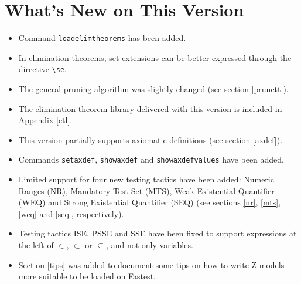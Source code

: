 \section{What's New on This Version}

\begin{itemize}
\item Command \verb+loadelimtheorems+ has been added.

\item In elimination theorems, set extensions can be better expressed through the directive \verb+\se+.


\item The general pruning algorithm was slightly changed (see section \ref{prunett}).


\item The elimination theorem library delivered with this version is included in Appendix \ref{etl}.

\item This version partially supports axiomatic definitions (see section \ref{axdef}).

\item Commands \verb+setaxdef+, \verb+showaxdef+ and \verb+showaxdefvalues+ have been added.

\item Limited support for four new testing tactics have been added: Numeric Ranges (NR), Mandatory Test Set (MTS), Weak Existential Quantifier (WEQ) and Strong Existential Quantifier (SEQ) (see sections \ref{nr}, \ref{mts}, \ref{weq} and \ref{seq}, respectively).

\item Testing tactics ISE, PSSE and SSE have been fixed to support expressions at the left of $\in$, $\subset$ or $\subseteq$, and not only variables.

\item Section \ref{tips} was added to document some tips on how to write Z models more suitable to be loaded on Fastest.


\end{itemize}
